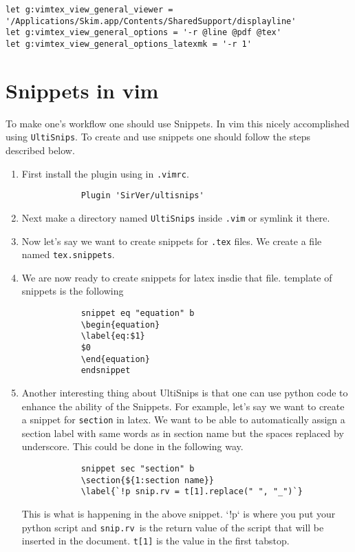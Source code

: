 \documentclass{article}
\begin{document}
\begin{verbatim}
let g:vimtex_view_general_viewer = '/Applications/Skim.app/Contents/SharedSupport/displayline'
let g:vimtex_view_general_options = '-r @line @pdf @tex'
let g:vimtex_view_general_options_latexmk = '-r 1'   
\end{verbatim}


\section{Snippets in vim}
\label{sec:snippets-in-vim}
To make one's workflow one should use Snippets. In vim this nicely accomplished
using \verb!UltiSnips!. To create and use snippets one should follow the steps
described below.

\begin{enumerate}
    \item First install the plugin using in \verb!.vimrc!. 
        \begin{verbatim}
            Plugin 'SirVer/ultisnips'
        \end{verbatim}
    \item Next make a directory named \verb!UltiSnips! inside \verb!.vim! or
        symlink it there. 
    \item Now let's say we want to create snippets for \verb!.tex! files. We
        create a file named \verb!tex.snippets!. 
    \item We are now ready to create snippets for latex insdie that file.
        template of snippets is the following
        \begin{verbatim}
            snippet eq "equation" b
            \begin{equation}
            \label{eq:$1}
            $0
            \end{equation}
            endsnippet
        \end{verbatim}
    \item Another interesting thing about UltiSnips is that one can use python
        code to enhance the ability of the Snippets. For example, let's say we
        want to create a snippet for \verb!section! in latex. We want to be able
        to automatically assign a section label with same words as in section
        name but the spaces replaced by underscore. This could be done in the
        following way.
        \begin{verbatim}
            snippet sec "section" b
            \section{${1:section name}}
            \label{`!p snip.rv = t[1].replace(" ", "_")`}
        \end{verbatim}
        This is what is happening in the above snippet. `!p` is where you
        put your python script and \verb!snip.rv !is the return value of the
        script that will be inserted in the document. \verb!t[1]! is the value 
        in the first tabstop.
        
\end{enumerate}
\end{document}
